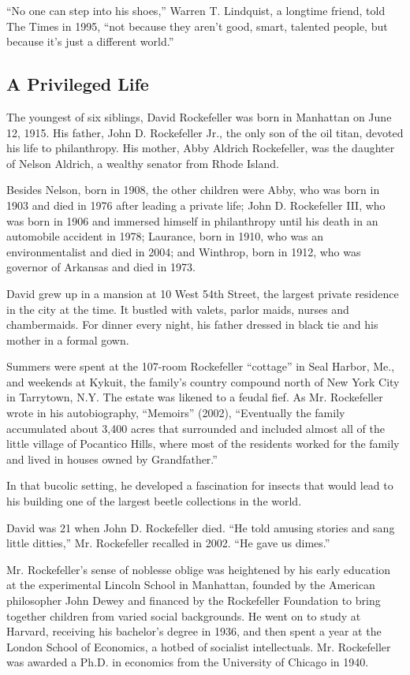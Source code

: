 ``No one can step into his shoes,'' Warren T. Lindquist, a longtime
friend, told The Times in 1995, ``not because they aren't good, smart,
talented people, but because it's just a different world.''

\hypertarget{a-privileged-life}{%
\subsection{A Privileged Life}\label{a-privileged-life}}

The youngest of six siblings, David Rockefeller was born in Manhattan on
June 12, 1915. His father, John D. Rockefeller Jr., the only son of the
oil titan, devoted his life to philanthropy. His mother, Abby Aldrich
Rockefeller, was the daughter of Nelson Aldrich, a wealthy senator from
Rhode Island.

Besides Nelson, born in 1908, the other children were Abby, who was born
in 1903 and died in 1976 after leading a private life; John D.
Rockefeller III, who was born in 1906 and immersed himself in
philanthropy until his death in an automobile accident in 1978;
Laurance, born in 1910, who was an environmentalist and died in 2004;
and Winthrop, born in 1912, who was governor of Arkansas and died in
1973.

David grew up in a mansion at 10 West 54th Street, the largest private
residence in the city at the time. It bustled with valets, parlor maids,
nurses and chambermaids. For dinner every night, his father dressed in
black tie and his mother in a formal gown.

Summers were spent at the 107-room Rockefeller ``cottage'' in Seal
Harbor, Me., and weekends at Kykuit, the family's country compound north
of New York City in Tarrytown, N.Y. The estate was likened to a feudal
fief. As Mr. Rockefeller wrote in his autobiography, ``Memoirs'' (2002),
``Eventually the family accumulated about 3,400 acres that surrounded
and included almost all of the little village of Pocantico Hills, where
most of the residents worked for the family and lived in houses owned by
Grandfather.''

In that bucolic setting, he developed a fascination for insects that
would lead to his building one of the largest beetle collections in the
world.

David was 21 when John D. Rockefeller died. ``He told amusing stories
and sang little ditties,'' Mr. Rockefeller recalled in 2002. ``He gave
us dimes.''

Mr. Rockefeller's sense of noblesse oblige was heightened by his early
education at the experimental Lincoln School in Manhattan, founded by
the American philosopher John Dewey and financed by the Rockefeller
Foundation to bring together children from varied social backgrounds. He
went on to study at Harvard, receiving his bachelor's degree in 1936,
and then spent a year at the London School of Economics, a hotbed of
socialist intellectuals. Mr. Rockefeller was awarded a Ph.D. in
economics from the University of Chicago in 1940.


